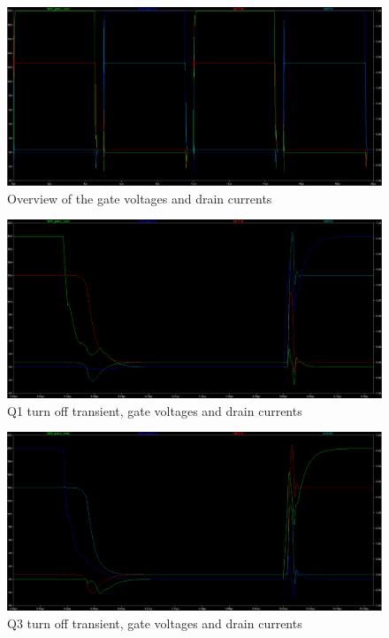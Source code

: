 \begin{figure}[H]
	\centering
	\includegraphics[width=\textwidth]{pictures/implementation/plain/plain_gates_1.PNG}
	\caption{Overview of the gate voltages and drain currents}
	\label{fig:plain_gates_1}
\end{figure}

\begin{figure}[H]
	\centering
	\includegraphics[width=\textwidth]{pictures/implementation/plain/plain_gates_2.PNG}
	\caption{Q1 turn off transient, gate voltages and drain currents}
	\label{fig:plain_gates_2}
\end{figure}

\begin{figure}[H]
	\centering
	\includegraphics[width=\textwidth]{pictures/implementation/plain/plain_gates_3.PNG}
	\caption{Q3 turn off transient, gate voltages and drain currents}
	\label{fig:plain_gates_3}
\end{figure}

